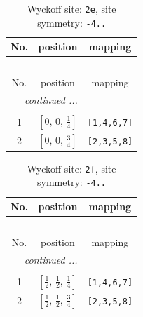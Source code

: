 \documentclass[fleqn,8pt]{jsarticle}
\begin{document}
\begin{longtable}{ccc}
\caption{Wyckoff site: {\tt 2e}, site symmetry: {\tt -4..}}
 \\
 \hline \hline
No. & position & mapping \\ \hline \endfirsthead

\multicolumn{2}{l}{\tablename\ \thetable{}} \\
 \hline \hline
No. & position & mapping \\ \hline \endhead

 \hline \hline
\multicolumn{2}{r}{\footnotesize\it continued ...} \\ \endfoot

 \hline \hline
\multicolumn{2}{r}{} \\ \endlastfoot

1 & $\left[ 0,\, 0,\, \frac{1}{4} \right]$ & {\tt [1,4,6,7]} \\ \hline
2 & $\left[ 0,\, 0,\, \frac{3}{4} \right]$ & {\tt [2,3,5,8]} \\
\end{longtable}
\renewcommand{\arraystretch}{1.2}
\begin{longtable}{ccc}
\caption{Wyckoff site: {\tt 2f}, site symmetry: {\tt -4..}}
 \\
 \hline \hline
No. & position & mapping \\ \hline \endfirsthead

\multicolumn{2}{l}{\tablename\ \thetable{}} \\
 \hline \hline
No. & position & mapping \\ \hline \endhead

 \hline \hline
\multicolumn{2}{r}{\footnotesize\it continued ...} \\ \endfoot

 \hline \hline
\multicolumn{2}{r}{} \\ \endlastfoot

1 & $\left[ \frac{1}{2},\, \frac{1}{2},\, \frac{1}{4} \right]$ & {\tt [1,4,6,7]} \\ \hline
2 & $\left[ \frac{1}{2},\, \frac{1}{2},\, \frac{3}{4} \right]$ & {\tt [2,3,5,8]} \\
\end{longtable}
\renewcommand{\arraystretch}{1.2}
\end{document}
